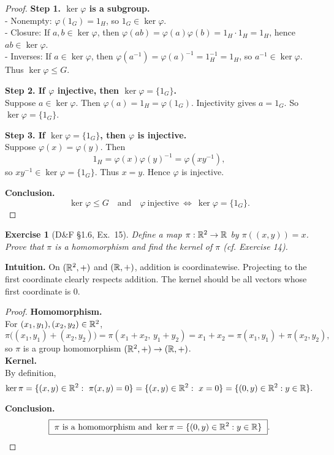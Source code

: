 \documentclass[12pt]{article}
\newtheorem{exercise}[theorem]{Exercise}
\theoremstyle{definition}
\begin{document}
\begin{proof}
\noindent\textbf{Step 1. $\ker\varphi$ is a subgroup.}\\
- Nonempty: $\varphi(1_G)=1_H$, so $1_G\in\ker\varphi$.\\
- Closure: If $a,b\in\ker\varphi$, then $\varphi(ab)=\varphi(a)\varphi(b)=1_H\cdot 1_H=1_H$, hence $ab\in\ker\varphi$.\\
- Inverses: If $a\in\ker\varphi$, then $\varphi(a^{-1})=\varphi(a)^{-1}=1_H^{-1}=1_H$, so $a^{-1}\in\ker\varphi$.\\
Thus $\ker\varphi\le G$.  

\smallskip
\noindent\textbf{Step 2. If $\varphi$ injective, then $\ker\varphi=\{1_G\}$.}\\
Suppose $a\in\ker\varphi$. Then $\varphi(a)=1_H=\varphi(1_G)$.  
Injectivity gives $a=1_G$. So $\ker\varphi=\{1_G\}$.  

\smallskip
\noindent\textbf{Step 3. If $\ker\varphi=\{1_G\}$, then $\varphi$ is injective.}\\
Suppose $\varphi(x)=\varphi(y)$. Then
\[
1_H=\varphi(x)\varphi(y)^{-1}=\varphi(xy^{-1}),
\]
so $xy^{-1}\in\ker\varphi=\{1_G\}$. Thus $x=y$. Hence $\varphi$ is injective.  

\smallskip
\noindent\textbf{Conclusion.}
\[
\boxed{
\ker\varphi\le G
\quad\text{and}\quad
\varphi\ \text{injective}\ \Longleftrightarrow\ \ker\varphi=\{1_G\}.
}
\]
\end{proof}

\newpage

\begin{exercise}[D\&F §1.6, Ex.~15]
Define a map $\pi:\Bbb R^2\to\Bbb R$ by $\pi((x,y))=x$. Prove that $\pi$ is a homomorphism and find the kernel of $\pi$ (cf. Exercise 14).
\end{exercise}

\dotfill

\noindent\textbf{Intuition.}
On $(\Bbb R^2,+)$ and $(\Bbb R,+)$, addition is coordinatewise. Projecting to the first coordinate clearly respects addition. The kernel should be all vectors whose first coordinate is $0$.\\

\dotfill

\begin{proof}
\noindent\textbf{Homomorphism.}\\
\noindent For $(x_1,y_1),(x_2,y_2)\in\Bbb R^2$,
\[
\pi\big((x_1,y_1)+(x_2,y_2)\big)=\pi(x_1+x_2,\,y_1+y_2)=x_1+x_2
=\pi(x_1,y_1)+\pi(x_2,y_2),
\]
so $\pi$ is a group homomorphism $(\Bbb R^2,+)\to(\Bbb R,+)$.\\

\noindent\textbf{Kernel.}\\
\noindent By definition,
\[
\ker\pi=\{(x,y)\in\Bbb R^2:\ \pi(x,y)=0\}=\{(x,y)\in\Bbb R^2:\ x=0\}
=\{(0,y)\in\Bbb R^2:y\in\Bbb R\}.
\]

\noindent\textbf{Conclusion.}
\[
\boxed{\ \pi \text{ is a homomorphism and } \ker\pi=\{(0,y)\in\Bbb R^2:y\in\Bbb R\}\ }.
\]
\end{proof}
\end{document}
